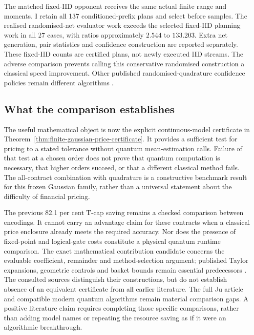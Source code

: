 The matched fixed-IID opponent receives the same actual finite range and
moments. I retain all 137 conditioned-prefix plans and select before samples.
The realised randomised-net evaluator work exceeds the selected fixed-IID
planning work in all 27 cases, with ratios approximately $2.544$ to
$133.203$. Extra net generation, pair statistics and confidence construction
are reported separately. These fixed-IID counts are certified plans, not
newly executed IID streams. The adverse comparison prevents calling this
conservative randomised construction a classical speed improvement.
Other published randomised-quadrature confidence policies remain different
algorithms \citep{jainrqmc,waudbysmithramdas}.

\subsection{What the comparison establishes}

The useful mathematical object is now the explicit continuous-model
certificate in Theorem~\ref{thm:finite-gaussian-price-certificate}. It
provides a sufficient test for pricing to a stated tolerance without
quantum mean-estimation calls. Failure of that test at a chosen order does
not prove that quantum computation is necessary, that higher orders succeed,
or that a different classical method fails. The all-contract combination
with quadrature is a constructive benchmark result for this frozen Gaussian
family, rather than a universal statement about the difficulty of financial
pricing.

The previous 82.1 per cent T-cap saving remains a checked comparison between
encodings. It cannot carry an advantage claim for these contracts when a
classical price enclosure already meets the required accuracy. Nor does the
presence of fixed-point and logical-gate costs constitute a physical quantum
runtime comparison. The exact mathematical contribution candidate concerns
the evaluable coefficient, remainder and method-selection argument; published
Taylor expansions, geometric controls and basket bounds remain essential
predecessors \citep{ju,kornzeytun,caldana,jiprezedate}.
The consulted sources distinguish their constructions, but do not establish
absence of an equivalent certificate from all earlier literature.
The full Ju article and compatible modern quantum algorithms remain material
comparison gaps. A positive literature claim requires completing those
specific comparisons, rather than adding model names or repeating the
resource saving as if it were an algorithmic breakthrough.
